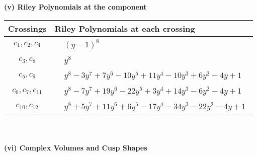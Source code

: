 \documentclass[1p]{elsarticle_modified}
\theoremstyle{definition}
\begin{document}
\newpage\renewcommand{\arraystretch}{1}
\flushleft \textbf{(v) Riley Polynomials at the component}\newline \\
\begin{tabular}{m{50pt}|m{274pt}}
Crossings & \hspace{64pt}Riley Polynomials at each crossing \\
\hline $$\begin{aligned}c_{1},c_{2},c_{4}\end{aligned}$$&$\begin{aligned}
&(y-1)^8
\end{aligned}$\\
\hline $$\begin{aligned}c_{3},c_{8}\end{aligned}$$&$\begin{aligned}
&y^8
\end{aligned}$\\
\hline $$\begin{aligned}c_{5},c_{9}\end{aligned}$$&$\begin{aligned}
&y^8-3 y^7+7 y^6-10 y^5+11 y^4-10 y^3+6 y^2-4 y+1
\end{aligned}$\\
\hline $$\begin{aligned}c_{6},c_{7},c_{11}\end{aligned}$$&$\begin{aligned}
&y^8-7 y^7+19 y^6-22 y^5+3 y^4+14 y^3-6 y^2-4 y+1
\end{aligned}$\\
\hline $$\begin{aligned}c_{10},c_{12}\end{aligned}$$&$\begin{aligned}
&y^8+5 y^7+11 y^6+6 y^5-17 y^4-34 y^3-22 y^2-4 y+1
\end{aligned}$\\
\hline
\end{tabular}\\~\\
\newpage\flushleft \textbf{(vi) Complex Volumes and Cusp Shapes}
\end{document}

